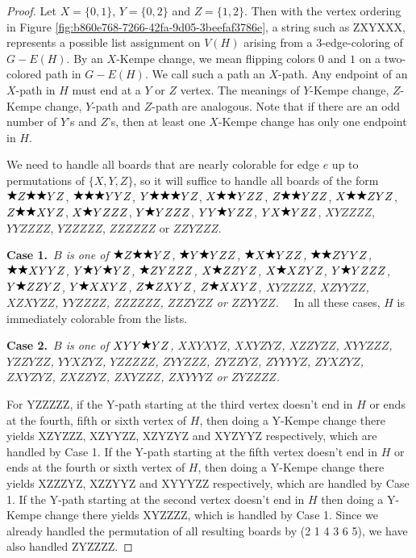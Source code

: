 \documentclass[12pt]{article}
\theoremstyle{plain}
\theoremstyle{definition}
\theoremstyle{remark}
\newcommand{\case}[2]{{\bf Case #1.}~{\it #2}~~}
\newcommand{\wild}{\raisebox{0.75\depth}{$\bigstar$}}
\begin{document}
\begin{proof}Let $X = \{0,1\}$, $Y = \{0,2\}$ and $Z = \{1,2\}$. Then with the vertex ordering in Figure \ref{fig:b860e768-7266-42fa-9d05-3beefaf3786e}, a string such as ZXYXXX, 
	represents a possible list assignment on $V(H)$ arising from a $3$-edge-coloring of $G-E(H)$.
	By an $X$-Kempe change, we mean flipping colors $0$ and $1$ on a two-colored path in $G-E(H)$.  We call such a path an $X$-path. 
	Any endpoint of an $X$-path in $H$ must end at a $Y$ or $Z$ vertex.  The meanings of $Y$-Kempe change, $Z$-Kempe change, $Y$-path and $Z$-path are analogous.
	Note that if there are an odd number of $Y$'s and $Z$'s, then at least one $X$-Kempe change has only one endpoint in $H$.
	
	We need to handle all boards that are nearly colorable for edge $e$ up to permutations of $\{X,Y,Z\}$, so it will suffice to handle all boards of the form $\wild Z\wild \wild YZ$, $\wild \wild \wild YYZ$, $Y\wild \wild \wild YZ$, $X\wild \wild YZZ$, $Z\wild \wild YZZ$, $X\wild \wild ZYZ$, $Z\wild \wild XYZ$, $X\wild YZZZ$, $Y\wild YZZZ$, $YY\wild YZZ$, $YX\wild YZZ$, $XYZZZZ$, $YYZZZZ$, $YZZZZZ$, $ZZZZZZ$ or $ZZYZZZ$.
	
	\case{1}{$B$ is one of $\wild Z\wild \wild YZ$, $\wild Y\wild YZZ$, $\wild X\wild YZZ$, $\wild \wild ZYYZ$, $\wild \wild XYYZ$, $Y\wild Y\wild YZ$, $\wild ZYZZZ$, $X\wild ZZYZ$, $X\wild XZYZ$, $Y\wild YZZZ$, $Y\wild ZZYZ$, $Y\wild XXYZ$, $Z\wild ZXYZ$, $Z\wild XXYZ$, $XYZZZZ$, $XZYYZZ$, $XZXYZZ$, $YYZZZZ$, $ZZZZZZ$, $ZZZYZZ$ or $ZZYYZZ$.}
	In all these cases, $H$ is immediately colorable from the lists.
	
	\case{2}{$B$ is one of $XYY\wild YZ$, $XXYXYZ$, $XXYZYZ$, $XZZYZZ$, $XYYZZZ$, $YZZYZZ$, $YYXZYZ$, $YZZZZZ$, $ZYYZZZ$, $ZYZZYZ$, $ZYYYYZ$, $ZYXZYZ$, $ZXYZYZ$, $ZXZZYZ$, $ZXYZZZ$, $ZXYYYZ$ or $ZYZZZZ$.}
	
	
	For YZZZZZ, if the Y-path starting at the third vertex doesn't end in $H$ or ends at the fourth, fifth or sixth vertex of $H$, then doing a Y-Kempe change there yields XZYZZZ, XZYYZZ, XZYZYZ and XYZYYZ respectively, which are handled by Case 1.
	If the Y-path starting at the fifth vertex doesn't end in $H$ or ends at the fourth or sixth vertex of $H$, then doing a Y-Kempe change there yields XZZZYZ, XZZYYZ and XYYYZZ respectively, which are handled by Case 1.
	If the Y-path starting at the second vertex doesn't end in $H$ then doing a Y-Kempe change there yields XYZZZZ, which is handled by Case 1.
	Since we already handled the permutation of all resulting boards by (2 1 4 3 6 5), we have also handled ZYZZZZ.
	

\end{proof}
\end{document}
